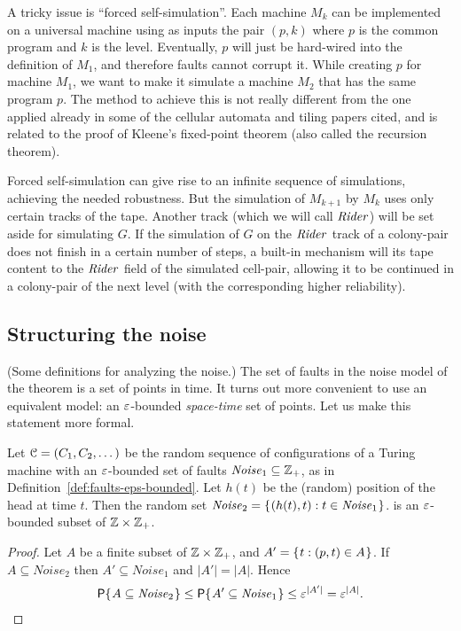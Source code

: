 \documentclass[11pt]{memoir}
\theoremstyle{definition} %
\renewcommand{\le}{\leq}
\newcommand{\fld}[1]{\ensuremath{\textit{#1\/}}}
\def\G{G} %
\newcommand{\Noise}{\mathit{Noise}}
\newcommand{\Rider}{\fld{Rider}} %
\begin{document}
A tricky issue is ``forced self-simulation''.
Each machine \( M_{k} \) can be implemented on a universal machine using as inputs
the pair \( (p,k) \) where \( p \) is the common program and \( k \) is the level.
Eventually, \( p \) will just be hard-wired into the definition of \( M_{1} \),
and therefore faults cannot corrupt it.
While creating \( p \) for machine \( M_{1} \),
we want to make it simulate a machine \( M_{2} \) that has the same program \( p \).
The method to achieve this is not really different from the one
applied already in some of the cellular automata and tiling papers cited, 
and is related to the proof of Kleene's fixed-point theorem (also called the recursion theorem).

Forced self-simulation can give rise to an infinite sequence of simulations, achieving
the needed robustness.
But the simulation of \( M_{k+1} \) by \( M_{k} \) uses only certain tracks of the tape.
Another track  (which we will call \( \Rider \)) will be set aside
for simulating \( \G \).
If the simulation of \( \G \) on the \( \Rider \) track of a colony-pair
does not finish in a certain number of steps,
a built-in mechanism will  its tape content to the \( \Rider \)
field of the simulated cell-pair, allowing it to be continued in a colony-pair of the next
level (with the corresponding higher reliability).

\subsection{Structuring the noise}\label{sec:sparsity-informal}

(Some definitions for analyzing the noise.)
The set of faults in the noise model of the theorem is a set of points in time.
It turns out more convenient to use an equivalent model:
an \( \varepsilon \)-bounded \emph{space-time} set of points.
Let us make this statement more formal.

\begin{lemma}
  Let \( \mathcal{C}=(C_{1},C_{2},\dots) \) be the random sequence of configurations of a Turing machine
  with an \( \varepsilon \)-bounded set of faults \( \Noise_{1}\subseteq\bbZ_{+} \),
  as in Definition~\ref{def:faults-eps-bounded}.
  Let \( h(t) \) be the (random) position of the head at time \( t \).
  Then the random set \( \Noise_{2}=\setOf{(h(t),t)}{t\in\Noise_{1}} \).
is an \( \varepsilon \)-bounded subset of \( \mathbb{Z}\times\mathbb{Z}_{+} \).
\end{lemma}
\begin{proof}
  Let \( A \) be a finite subset of  \( \mathbb{Z}\times\mathbb{Z}_{+} \), and
  \( A' = \mathopen\{\mskip 1mu t : (p,t)\in A\mskip 1mu\mathclose\} \).
  If \( A\subseteq\Noise_{2} \) then \( A'\subseteq\Noise_{1} \) and \( |A'|=|A| \).
  Hence 
\begin{align*}
 \Pbof{A\subseteq\Noise_{2}}\le\Pbof{A'\subseteq\Noise_{1}}\le \eps^{|A'|}=\eps^{|A|} .
\end{align*}
\end{proof}
\end{document}
